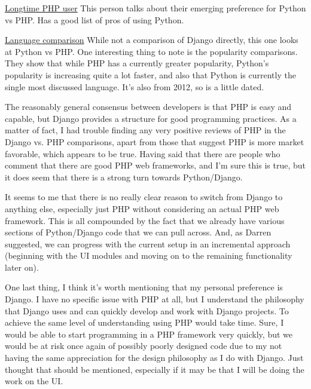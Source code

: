 \documentclass[12pt]{article}
\begin{document}
\begin{description}
\item \href{http://www.reddit.com/r/Python/comments/23jbeq/python\_uses\_why\_python\_vs\_php/}{Longtime PHP user} This person talks about their emerging preference for Python vs PHP. Has
a good list of pros of using Python.
\item \href{https://www.udemy.com/blog/modern-language-wars/}{Language comparison} While
not a comparison of Django directly, this one looks at Python vs PHP. One interesting thing
to note is the popularity comparisons. They show that while PHP has a currently greater
popularity, Python's popularity is increasing quite a lot faster, and also that Python is
currently the single most discussed language. It's also from 2012, so is a little dated.
\end{description}

The reasonably general consensus between developers is that PHP is easy and capable, but
Django provides a structure for good programming practices. As a matter of fact,
I had trouble finding any very positive reviews of PHP in the Django vs. PHP comparisons,
apart from those that suggest PHP is more market favorable, which appears to be true. Having
said that there are people who comment that there are good PHP web frameworks, and I'm sure
this is true, but it does seem that there is a strong turn towards Python/Django.

It seems to me that there is no really clear reason to switch from Django to anything else,
especially just PHP without considering an actual PHP web framework. This is all compounded
by the fact that we already have various sections of Python/Django code that we can pull
across. And, as Darren suggested, we can progress with the
current setup in an incremental approach (beginning with the UI modules and moving on to
the remaining functionality later on).

One last thing, I think it's worth mentioning that my personal preference is Django. I have
no specific issue with PHP at all, but I understand the philosophy that Django uses and can
quickly develop and work with Django projects. To achieve the same level of understanding
using PHP would take time. Sure, I would be able to start programming in a PHP framework
very quickly, but we would be at risk once again of possibly poorly designed code due to
my not having the same appreciation for the design philosophy as I do with Django. Just thought
that should be mentioned, especially if it may be that I will be doing the work on the UI.
\end{document}
